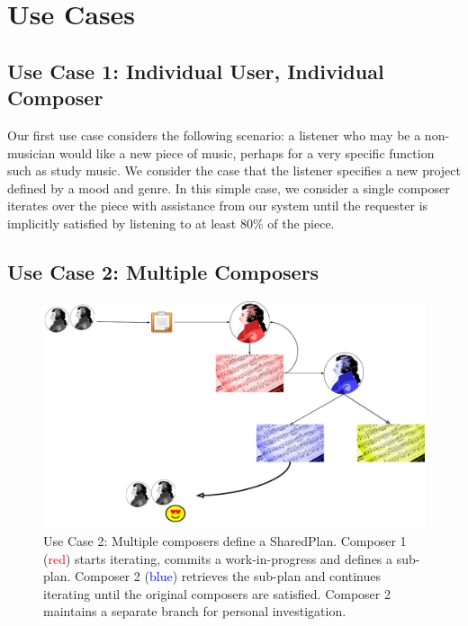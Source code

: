 \documentclass[final,authoryear,5p,times,twocolumn]{elsarticle}
\begin{document}
\section{Use Cases}

\subsection{Use Case 1: Individual User, Individual Composer}

Our first use case considers the following scenario: a listener who may be a non-musician would like a new piece of music, perhaps for a very specific function such as study music. We consider the case that the listener specifies a new project defined by a mood and genre. In this simple case, we consider a single composer iterates over the piece with assistance from our system until the requester is implicitly satisfied by listening to at least 80\% of the piece.

\subsection{Use Case 2: Multiple Composers}

\begin{figure}
	\includegraphics[scale=0.35]{multicomposer.pdf}
	\caption{Use Case 2: Multiple composers define a SharedPlan. Composer 1 (\textcolor{red}{red}) starts
	iterating, commits a work-in-progress and defines a sub-plan. Composer 2 (\textcolor{blue}{blue}) retrieves the sub-plan and continues iterating until the original composers are
	satisfied. Composer 2 maintains a separate branch for personal investigation.}
	\label{fig:multicomposer}
\end{figure}

\end{document}

